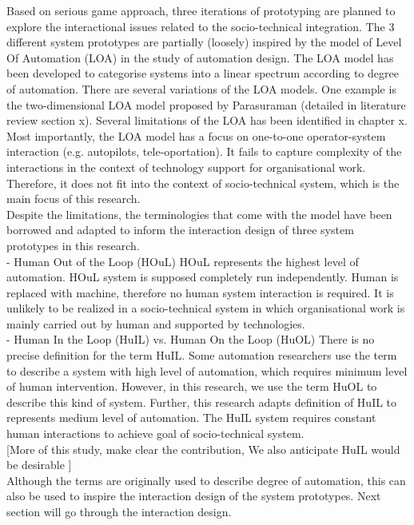 Based on serious game approach, three iterations of prototyping are planned to explore the interactional issues related to the socio-technical integration. The 3 different system prototypes are partially (loosely) inspired by the model of Level Of Automation (LOA) in the study of automation design. The LOA model has been developed to categorise systems into a linear spectrum according to degree of automation. There are several variations of the LOA models. One example is the two-dimensional LOA model proposed by Parasuraman (detailed in literature review section x). Several limitations of the LOA has been identified in chapter x. Most importantly, the LOA model has a focus on one-to-one operator-system interaction (e.g. autopilots, tele-oportation). It fails to capture complexity of the interactions in the context of technology support for organisational work. Therefore, it does not fit into the context of socio-technical system, which is the main focus of this research. \\

Despite the limitations, the terminologies that come with the model have been borrowed and adapted to inform the interaction design of three system prototypes in this research. \\

- Human Out of the Loop (HOuL)
HOuL represents the highest level of automation. HOuL system is supposed completely run independently. Human is replaced with machine, therefore no human system interaction is required. It is unlikely to be realized in a socio-technical system in which organisational work is mainly carried out by human and supported by technologies. \\

- Human In the Loop (HuIL) vs. Human On the Loop (HuOL)
There is no precise definition for the term HuIL. Some automation researchers use the term to describe a system with high level of automation, which requires minimum level of human intervention. However, in this research, we use the term HuOL to describe this kind of system. Further, this research adapts definition of HuIL to represents medium level of automation. The HuIL system requires constant human interactions to achieve goal of socio-technical system.\\

[More of this study, make clear the contribution, We also anticipate HuIL would be desirable ]\\

Although the terms are originally used to describe degree of automation, this can also be used to inspire the interaction design of the system prototypes. Next section will go through the interaction design.\\



